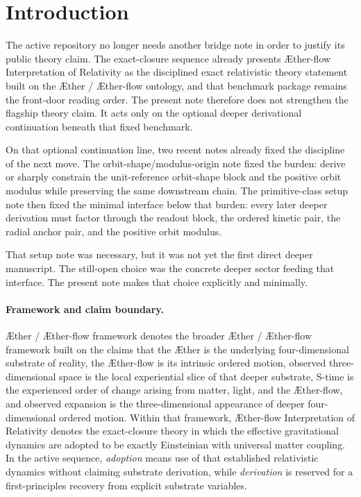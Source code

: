 \documentclass[11pt]{article}
\newcommand{\Aether}{\AE{}ther}
\newcommand{\Aflow}{\AE{}ther-flow}
\newcommand{\TheoryName}{\Aflow{} Interpretation of Relativity}
\newcommand{\TheoryProgram}{\Aether{} / \Aflow{} framework}
\begin{document}
\section{Introduction}

The active repository no longer needs another bridge note in order to justify its public theory claim. The exact-closure sequence already presents \TheoryName{} as the disciplined exact relativistic theory statement built on the \Aether{} / \Aflow{} ontology, and that benchmark package remains the front-door reading order. The present note therefore does not strengthen the flagship theory claim. It acts only on the optional deeper derivational continuation beneath that fixed benchmark.

On that optional continuation line, two recent notes already fixed the discipline of the next move. The orbit-shape/modulus-origin note fixed the burden: derive or sharply constrain the unit-reference orbit-shape block and the positive orbit modulus while preserving the same downstream chain. The primitive-class setup note then fixed the minimal interface below that burden: every later deeper derivation must factor through the readout block, the ordered kinetic pair, the radial anchor pair, and the positive orbit modulus.

That setup note was necessary, but it was not yet the first direct deeper manuscript. The still-open choice was the concrete deeper sector feeding that interface. The present note makes that choice explicitly and minimally.

\paragraph{Framework and claim boundary.}
\TheoryProgram{} denotes the broader \Aether{} / \Aflow{} framework built on the claims that the \Aether{} is the underlying four-dimensional substrate of reality, the \Aflow{} is its intrinsic ordered motion, observed three-dimensional space is the local experiential slice of that deeper substrate, S-time is the experienced order of change arising from matter, light, and the \Aflow{}, and observed expansion is the three-dimensional appearance of deeper four-dimensional ordered motion. Within that framework, \TheoryName{} denotes the exact-closure theory in which the effective gravitational dynamics are adopted to be exactly Einsteinian with universal matter coupling. In the active sequence, \emph{adoption} means use of that established relativistic dynamics without claiming substrate derivation, while \emph{derivation} is reserved for a first-principles recovery from explicit substrate variables.
\end{document}
